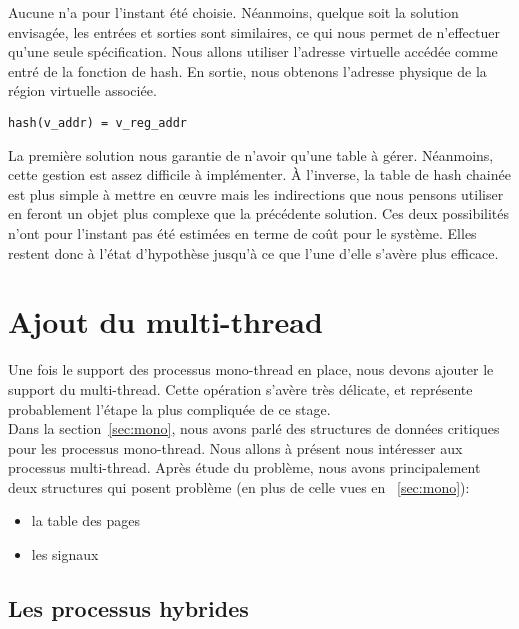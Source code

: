       Aucune n'a pour l'instant été choisie. Néanmoins, quelque soit la solution
      envisagée, les entrées et sorties sont similaires, ce qui nous permet de
      n'effectuer qu'une seule spécification. Nous allons utiliser l'adresse
      virtuelle accédée comme entré de la fonction de hash. En sortie, nous
      obtenons l'adresse physique de la région virtuelle associée.

      \begin{center}
        \texttt{hash(v\_addr) = v\_reg\_addr}
      \end{center}

      La première solution nous garantie de n'avoir qu'une table à
      gérer. Néanmoins, cette gestion est assez difficile à implémenter. À
      l'inverse, la table de hash chainée est plus simple à mettre en \oe uvre
      mais les indirections que nous pensons utiliser en feront un objet plus
      complexe que la précédente solution. Ces deux possibilités n'ont pour
      l'instant pas été estimées en terme de coût pour le système. Elles restent
      donc à l'état d'hypothèse jusqu'à ce que l'une d'elle s'avère plus
      efficace.


  \section{Ajout du multi-thread}
  \label{sec:multi}  

    Une fois le support des processus mono-thread en place, nous devons ajouter
    le support du multi-thread. Cette opération s'avère très délicate, et
    représente probablement l'étape la plus compliquée de ce stage.\\

    Dans la section~\ref{sec:mono}, nous avons parlé des structures de données
    critiques pour les processus mono-thread. Nous allons à présent nous
    intéresser aux processus multi-thread. Après étude du problème, nous avons
    principalement deux structures qui posent problème (en plus de celle vues en
    ~\ref{sec:mono}):
    \begin{itemize}
      \item la table des pages
      \item les signaux
    \end{itemize}  

    \subsection{Les processus hybrides}

